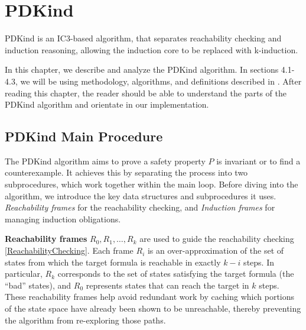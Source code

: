 \chapter{PDKind}
\label{PD-Kind}
\noindent PDKind is an IC3\cite{6148908}-based algorithm, that separates reachability checking and induction reasoning, allowing the induction core to be replaced with k-induction.

In this chapter, we describe and analyze the PDKind algorithm. In sections 4.1-4.3, we will be using methodology, algorithms, and definitions described in \cite{7886665}.
After reading this chapter, the reader should be able to understand the parts of the PDKind algorithm and orientate in our implementation.


\section{PDKind Main Procedure}  \label{sec:main} The PDKind algorithm aims
to prove a safety property $P$ is invariant or to find a counterexample. It
achieves this by separating the process into two subprocedures, which work together within the main
loop. Before diving into the algorithm, we introduce the key data structures
and subprocedures it uses. \textit{Reachability frames} for the reachability
checking, and \textit{Induction frames} for managing induction obligations.

\textbf{Reachability frames} $R_0, R_1, \dots, R_k$ are used to guide the
reachability checking \ref{ReachabilityChecking}. Each frame $R_i$ is an
over-approximation of the set of states from which the target formula is
reachable in exactly $k - i$ steps. In particular, $R_k$ corresponds to the set
of states satisfying the
target formula (the “bad” states), and $R_0$ represents states that can reach
the target in $k$ steps. These reachability frames help avoid redundant work by
caching which portions of the state space have already been shown to be
unreachable, thereby preventing the algorithm from re-exploring those paths.

